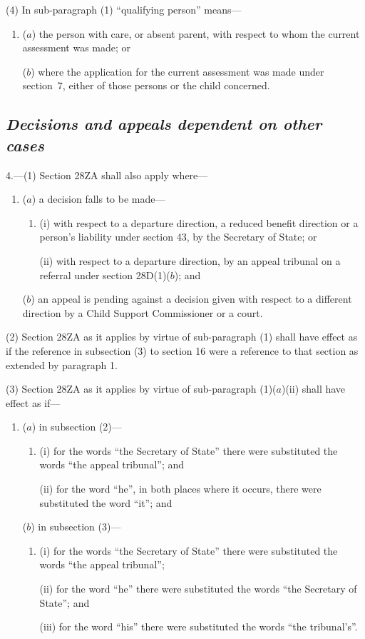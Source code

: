 \documentclass[12pt,a4paper]{article}
\begin{document}
(4) In sub-paragraph (1) “qualifying person” means—
\begin{enumerate}\item[]
($a$) the person with care, or absent parent, with respect to whom the current assessment was made; or

($b$) where the application for the current assessment was made under section~7, either of those persons or the child concerned.
\end{enumerate}

\subsection*{\itshape Decisions and appeals dependent on other cases}

4.---(1) Section 28ZA shall also apply where—
\begin{enumerate}\item[]
($a$) a decision falls to be made—
\begin{enumerate}\item[]
(i) with respect to a departure direction, a reduced benefit direction or a person’s liability under section 43, by the Secretary of State; or

(ii) with respect to a departure direction, by an appeal tribunal on a referral under section 28D(1)($b$); and
\end{enumerate}

($b$) an appeal is pending against a decision given with respect to a different direction by a Child Support Commissioner or a court.
\end{enumerate}

(2) Section 28ZA as it applies by virtue of sub-paragraph (1) shall have effect as if the reference in subsection (3) to section 16 were a reference to that section as extended by paragraph 1.

(3) Section 28ZA as it applies by virtue of sub-paragraph (1)($a$)(ii) shall have effect as if—
\begin{enumerate}\item[]
($a$) in subsection (2)—
\begin{enumerate}\item[]
(i) for the words “the Secretary of State” there were substituted the words “the appeal tribunal”; and

(ii) for the word “he”, in both places where it occurs, there were substituted the word “it”; and
\end{enumerate}

($b$) in subsection (3)—
\begin{enumerate}\item[]
(i) for the words “the Secretary of State” there were substituted the words “the appeal tribunal”;

(ii) for the word “he” there were substituted the words “the Secretary of State”; and

(iii) for the word “his” there were substituted the words “the tribunal's”.
\end{enumerate}
\end{enumerate}
\end{document}
